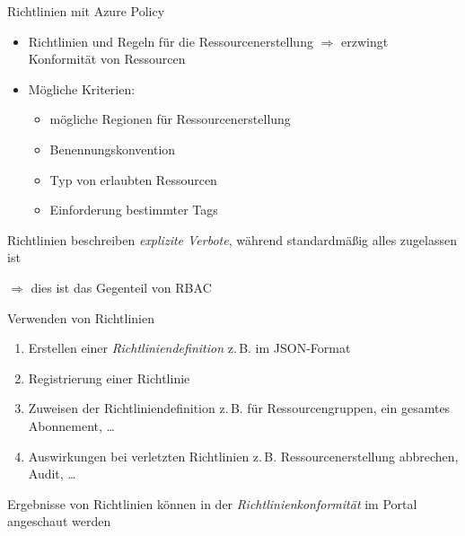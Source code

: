 
\begin{flashcard}[Definition]{Richtlinien mit Azure Policy}
    \begin{itemize}
        \item Richtlinien und Regeln für die Ressourcenerstellung\newline
        $\Rightarrow$ erzwingt Konformität von Ressourcen
        \item Mögliche Kriterien:
        \begin{itemize}
            \item mögliche Regionen für Ressourcenerstellung
            \item Benennungskonvention
            \item Typ von erlaubten Ressourcen
            \item Einforderung bestimmter Tags
        \end{itemize}
    \end{itemize}
    
    \vspace{5mm}
    Richtlinien beschreiben \emph{explizite Verbote}, während standardmäßig alles zugelassen ist
    
    $\Rightarrow$ dies ist das Gegenteil von RBAC
\end{flashcard}

\begin{flashcard}[\ ]{Verwenden von Richtlinien}
    \begin{enumerate}
        \item Erstellen einer \emph{Richtliniendefinition}\newline
        z.\,B. im JSON-Format
        \item Registrierung einer Richtlinie
        \item Zuweisen der Richtliniendefinition\newline
        z.\,B. für Ressourcengruppen, ein gesamtes Abonnement, \ldots
        \item Auswirkungen bei verletzten Richtlinien\newline
        z.\,B. Ressourcenerstellung abbrechen, Audit, \ldots
    \end{enumerate}
    
    \vspace{5mm}
    Ergebnisse von Richtlinien können in der \emph{Richtlinienkonformität} im Portal angeschaut werden
\end{flashcard}


